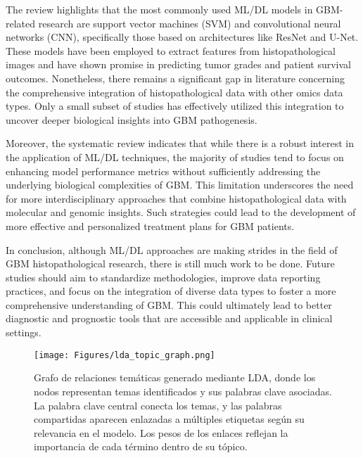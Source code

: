 \documentclass[runningheads]{llncs}
\begin{document}
The review highlights that the most commonly used ML/DL models in GBM-related research are support vector machines (SVM) and convolutional neural networks (CNN), specifically those based on architectures like ResNet and U-Net. These models have been employed to extract features from histopathological images and have shown promise in predicting tumor grades and patient survival outcomes. Nonetheless, there remains a significant gap in literature concerning the comprehensive integration of histopathological data with other omics data types. Only a small subset of studies has effectively utilized this integration to uncover deeper biological insights into GBM pathogenesis.

Moreover, the systematic review indicates that while there is a robust interest in the application of ML/DL techniques, the majority of studies tend to focus on enhancing model performance metrics without sufficiently addressing the underlying biological complexities of GBM. This limitation underscores the need for more interdisciplinary approaches that combine histopathological data with molecular and genomic insights. Such strategies could lead to the development of more effective and personalized treatment plans for GBM patients.

In conclusion, although ML/DL approaches are making strides in the field of GBM histopathological research, there is still much work to be done. Future studies should aim to standardize methodologies, improve data reporting practices, and focus on the integration of diverse data types to foster a more comprehensive understanding of GBM. This could ultimately lead to better diagnostic and prognostic tools that are accessible and applicable in clinical settings.
\begin{figure}[h]
\centering
\texttt{[image: Figures/lda\_topic\_graph.png]}
\caption{Grafo de relaciones temáticas generado mediante LDA, donde los nodos representan temas identificados y sus palabras clave asociadas. La palabra clave central conecta los temas, y las palabras compartidas aparecen enlazadas a múltiples etiquetas según su relevancia en el modelo. Los pesos de los enlaces reflejan la importancia de cada término dentro de su tópico.}
\end{figure}
\end{document}

